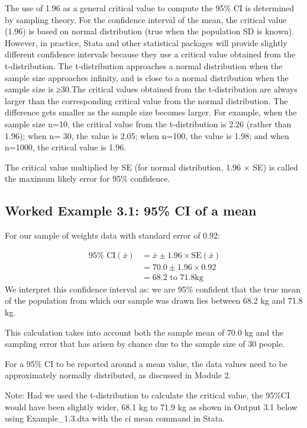 \documentclass[
]{memoir}
\begin{document}
The use of 1.96 as a general critical value to compute the 95\% CI is determined by sampling theory. For the confidence interval of the mean, the critical value (1.96) is based on normal distribution (true when the population SD is known). However, in practice, Stata and other statistical packages will provide slightly different confidence intervals because they use a critical value obtained from the t-distribution. The t-distribution approaches a normal distribution when the sample size approaches infinity, and is close to a normal distribution when the sample size is ≥30.The critical values obtained from the t-distribution are always larger than the corresponding critical value from the normal distribution. The difference gets smaller as the sample size becomes larger. For example, when the sample size n=10, the critical value from the t-distribution is 2.26 (rather than 1.96); when n= 30, the value is 2.05; when n=100, the value is 1.98; and when n=1000, the critical value is 1.96.

The critical value multiplied by SE (for normal distribution, 1.96 × SE) is called the maximum likely error for 95\% confidence.

\hypertarget{worked-example-3.1-95-ci-of-a-mean}{%
\subsection{Worked Example 3.1: 95\% CI of a mean}\label{worked-example-3.1-95-ci-of-a-mean}}

For our sample of weights data with standard error of 0.92:

\[
\begin{aligned}
\ 95\% \text{ CI}(\bar{x}) &=  \bar{x} \pm 1.96 \times \text{SE}(\bar{x}) \\
 &= 70.0 \pm 1.96 \times 0.92 \\
 &= 68.2 \text{ to } 71.8 \text{kg}
\end{aligned}
\]
We interpret this confidence interval as: we are 95\% confident that the true mean of the population from which our sample was drawn lies between 68.2 kg and 71.8 kg.

This calculation takes into account both the sample mean of 70.0 kg and the sampling error that has arisen by chance due to the sample size of 30 people.

For a 95\% CI to be reported around a mean value, the data values need to be approximately normally distributed, as discussed in Module 2.

Note: Had we used the t-distribution to calculate the critical value, the 95\%CI would have been slightly wider, 68.1 kg to 71.9 kg as shown in Output 3.1 below using Example\_1.3.dta with the ci mean command in Stata.
\end{document}

